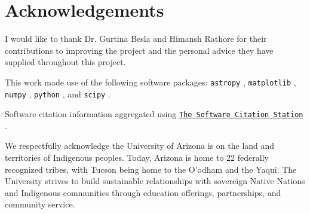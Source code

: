 \documentclass[fleqn,usenatbib]{mnras}
\begin{document}
\section{Acknowledgements}
I would like to thank Dr. Gurtina Besla and Himansh Rathore for their contributions to improving the project and the personal advice they have supplied throughout this project. 

\vspace{10pt}

This work made use of the following software packages: \texttt{astropy} \citep{astropy:2013, astropy:2018, astropy:2022}, \texttt{matplotlib} \citep{Hunter:2007}, \texttt{numpy} \citep{numpy}, \texttt{python} \citep{python}, and \texttt{scipy} \citep{2020SciPy-NMeth, scipy_14880408}.

Software citation information aggregated using \texttt{\href{https://www.tomwagg.com/software-citation-station/}{The Software Citation Station}} \citep{software-citation-station-paper, software-citation-station-zenodo}.
\vspace{10pt}

We respectfully acknowledge the University of Arizona is on the land and territories of Indigenous peoples. Today, Arizona is home to 22 federally recognized tribes, with Tucson being
home to the O’odham and the Yaqui. The University strives to build sustainable relationships with sovereign Native Nations and Indigenous communities through education offerings,
partnerships, and community service.















\bsp	%
\label{lastpage}
\end{document}
